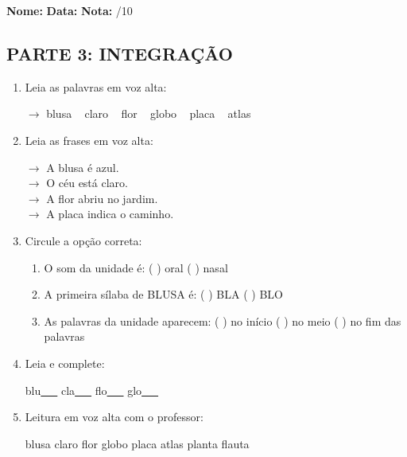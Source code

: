\begin{exercicio}

\noindent\textbf{Nome:} \underline{\hspace{3.2cm}} \quad \textbf{Data:} \underline{\hspace{1.6cm}} \quad \textbf{Nota:} \underline{\hspace{0.9cm}}/10


\subsection*{PARTE 3: INTEGRAÇÃO}

\begin{enumerate}[resume]

  \item Leia as palavras em voz alta:
  \begin{center}
  $\rightarrow$ blusa ~ claro ~ flor ~ globo ~ placa ~ atlas
  \end{center}

  \item Leia as frases em voz alta:
  \begin{center}
  $\rightarrow$ A blusa é azul.\\
  $\rightarrow$ O céu está claro.\\
  $\rightarrow$ A flor abriu no jardim.\\
  $\rightarrow$ A placa indica o caminho.\\
  \end{center}

  \item Circule a opção correta:
  \begin{enumerate}[label=(\alph*)]

    \item O som da unidade é: ( ) oral ( ) nasal 

    \item A primeira sílaba de BLUSA é: ( ) BLA ( ) BLO

    \item As palavras da unidade aparecem: ( ) no início ( ) no meio ( ) no fim das palavras

  \end{enumerate}

  \item Leia e complete:
  \begin{center}
  blu\underline{~~~} \quad cla\underline{~~~} \quad flo\underline{~~~} \quad glo\underline{~~~}
  \end{center}

  \item Leitura em voz alta com o professor:
  \begin{center}
  blusa \quad claro \quad flor \quad globo \quad placa \quad atlas \quad planta \quad flauta
  \end{center}

\end{enumerate}

\end{exercicio}

